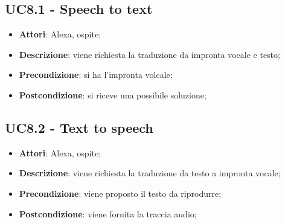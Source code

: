 \documentclass[../AnalisiDeiRequisiti.tex]{subfiles}
\begin{document}
\subsection{UC8.1 - Speech to text} 
\label{sssec:UC8.1} 
\begin{itemize} 
\item \textbf{Attori}: Alexa, ospite;
\item \textbf{Descrizione}: viene richiesta la traduzione da impronta vocale e testo;
\item \textbf{Precondizione}: si ha l'impronta volcale;
\item \textbf{Postcondizione}: si riceve una possibile soluzione;
\end{itemize} 
\subsection{UC8.2 - Text to speech}
\label{sssec:UC8.2} 
\begin{itemize} 
\item \textbf{Attori}: Alexa, ospite;
\item \textbf{Descrizione}: viene richiesta la traduzione da testo a impronta vocale;
\item \textbf{Precondizione}: viene proposto il testo da riprodurre;
\item \textbf{Postcondizione}: viene fornita la traccia audio;
\end{itemize} 
\newpage
\end{document}
